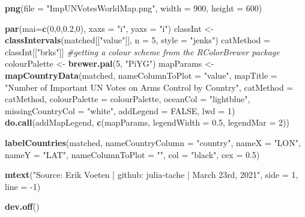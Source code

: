 \documentclass[
]{article}
\newenvironment{Shaded}{\begin{snugshade}}{\end{snugshade}}
\newcommand{\CommentTok}[1]{\textcolor[rgb]{0.56,0.35,0.01}{\textit{#1}}}
\newcommand{\DataTypeTok}[1]{\textcolor[rgb]{0.13,0.29,0.53}{#1}}
\newcommand{\DecValTok}[1]{\textcolor[rgb]{0.00,0.00,0.81}{#1}}
\newcommand{\FloatTok}[1]{\textcolor[rgb]{0.00,0.00,0.81}{#1}}
\newcommand{\KeywordTok}[1]{\textcolor[rgb]{0.13,0.29,0.53}{\textbf{#1}}}
\newcommand{\NormalTok}[1]{#1}
\newcommand{\OtherTok}[1]{\textcolor[rgb]{0.56,0.35,0.01}{#1}}
\newcommand{\StringTok}[1]{\textcolor[rgb]{0.31,0.60,0.02}{#1}}
\begin{document}
\begin{Shaded}
\begin{Highlighting}[]
\KeywordTok{png}\NormalTok{(}\DataTypeTok{file =} \StringTok{"ImpUNVotesWorldMap.png"}\NormalTok{,}
    \DataTypeTok{width =} \DecValTok{900}\NormalTok{, }\DataTypeTok{height =} \DecValTok{600}\NormalTok{)}

\KeywordTok{par}\NormalTok{(}\DataTypeTok{mai=}\KeywordTok{c}\NormalTok{(}\DecValTok{0}\NormalTok{,}\DecValTok{0}\NormalTok{,}\FloatTok{0.2}\NormalTok{,}\DecValTok{0}\NormalTok{), }\DataTypeTok{xaxs =} \StringTok{"i"}\NormalTok{, }\DataTypeTok{yaxs =} \StringTok{"i"}\NormalTok{)}
\NormalTok{classInt \textless{}{-}}\StringTok{ }\KeywordTok{classIntervals}\NormalTok{(matched[[}\StringTok{"value"}\NormalTok{]], }\DataTypeTok{n =} \DecValTok{5}\NormalTok{, }\DataTypeTok{style =} \StringTok{"jenks"}\NormalTok{)}
\NormalTok{catMethod =}\StringTok{ }\NormalTok{classInt[[}\StringTok{"brks"}\NormalTok{]]}
\CommentTok{\#getting a colour scheme from the RColorBrewer package}
\NormalTok{colourPalette \textless{}{-}}\StringTok{ }\KeywordTok{brewer.pal}\NormalTok{(}\DecValTok{5}\NormalTok{, }\StringTok{"PiYG"}\NormalTok{)}
\NormalTok{mapParams \textless{}{-}}\StringTok{ }\KeywordTok{mapCountryData}\NormalTok{(matched,}
               \DataTypeTok{nameColumnToPlot =} \StringTok{"value"}\NormalTok{,}
               \DataTypeTok{mapTitle =} \StringTok{"Number of Important UN Votes on Arms Control by Country"}\NormalTok{,}
               \DataTypeTok{catMethod =}\NormalTok{ catMethod,}
               \DataTypeTok{colourPalette =}\NormalTok{ colourPalette,}
               \DataTypeTok{oceanCol =} \StringTok{"lightblue"}\NormalTok{,}
               \DataTypeTok{missingCountryCol =} \StringTok{"white"}\NormalTok{,}
               \DataTypeTok{addLegend =} \OtherTok{FALSE}\NormalTok{,}
               \DataTypeTok{lwd =} \DecValTok{1}\NormalTok{)}
\KeywordTok{do.call}\NormalTok{(addMapLegend, }\KeywordTok{c}\NormalTok{(mapParams, }\DataTypeTok{legendWidth =} \FloatTok{0.5}\NormalTok{, }\DataTypeTok{legendMar =} \DecValTok{2}\NormalTok{))}

\KeywordTok{labelCountries}\NormalTok{(matched, }
               \DataTypeTok{nameCountryColumn =} \StringTok{"country"}\NormalTok{, }
               \DataTypeTok{nameX =} \StringTok{"LON"}\NormalTok{, }
               \DataTypeTok{nameY =} \StringTok{"LAT"}\NormalTok{, }
               \DataTypeTok{nameColumnToPlot =} \StringTok{""}\NormalTok{, }
               \DataTypeTok{col =} \StringTok{"black"}\NormalTok{,}
               \DataTypeTok{cex =} \FloatTok{0.5}\NormalTok{)}

\KeywordTok{mtext}\NormalTok{(}\StringTok{"Source: Erik Voeten | github: julia{-}tache | March 23rd, 2021"}\NormalTok{, }\DataTypeTok{side =} \DecValTok{1}\NormalTok{, }\DataTypeTok{line =} \DecValTok{{-}1}\NormalTok{)}

\KeywordTok{dev.off}\NormalTok{()}
\end{Highlighting}
\end{Shaded}
\end{document}
